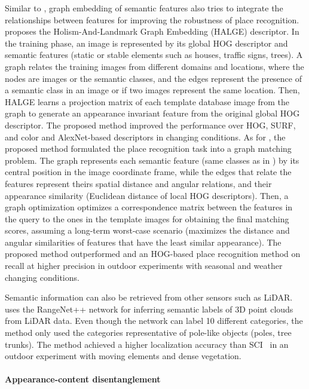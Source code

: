 Similar to \cite{singh-et-al:2021:9564866}, graph embedding of semantic features also tries to integrate the relationships between features for improving the robustness of place recognition.
\cite{han-et-al:2018:2856274} proposes the Holism-And-Landmark Graph Embedding (HALGE) descriptor. In the training phase, an image is represented by its global HOG descriptor and semantic features (static or stable elements such as houses, traffic signs, trees).
A graph relates the training images from different domains and locations, where the nodes are images or the semantic classes, and the edges represent the presence of a semantic class in an image or if two images represent the same location.
Then, HALGE learns a projection matrix of each template database image from the graph to generate an appearance invariant feature from the original global HOG descriptor. The proposed method improved the performance over HOG, SURF, and color and AlexNet-based descriptors in changing conditions.
As for \cite{gao-zhang:2020:9196906}, the proposed method formulated the place recognition task into a graph matching problem. The graph represents each semantic feature (same classes as in \cite{singh-et-al:2021:9564866}) by its central position in the image coordinate frame, while the edges that relate the features represent theirs spatial distance and angular relations, and their appearance similarity (Euclidean distance of local HOG descriptors). Then, a graph optimization optimizes a correspondence matrix between the features in the query to the ones in the template images for obtaining the final matching scores, assuming a long-term worst-case scenario (maximizes the distance and angular similarities of features that have the least similar appearance).
The proposed method outperformed \cite{han-et-al:2018:3} and an HOG-based place recognition method on recall at higher precision in outdoor experiments with seasonal and weather changing conditions.

Semantic information can also be retrieved from other sensors such as LiDAR. \cite{wang-et-al:2021:9739599} uses the RangeNet++ network for inferring semantic labels of 3D point clouds from LiDAR data. Even though the network can label 10 different categories, the method only used the categories representative of pole-like objects (poles, tree trunks). The method achieved a higher localization accuracy than SCI~\parencite{kim-et-al:2019:2897340} in an outdoor experiment with moving elements and dense vegetation.


\paragraph{Appearance-content disentanglement}

